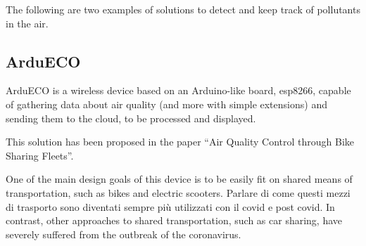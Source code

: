 	
	
	The following are two examples of solutions to detect and keep track of pollutants in the air.
	
	\subsection{ArduECO}

		
		ArduECO is a wireless device based on an Arduino-like board, esp8266, capable of gathering data about air quality (and more with simple extensions) and sending them to the cloud, to be processed and displayed.
		
		This solution has been proposed in the paper ``Air Quality Control through Bike Sharing Fleets''\cite{ardueco_paper}.
		
		One of the main design goals of this device is to be easily fit on shared means of transportation, such as bikes and electric scooters.
		Parlare di come questi mezzi di trasporto sono diventati sempre più utilizzati con il covid e post covid.
		In contrast, other approaches to shared transportation, such as car sharing, have severely suffered from the outbreak of the coronavirus.
		
